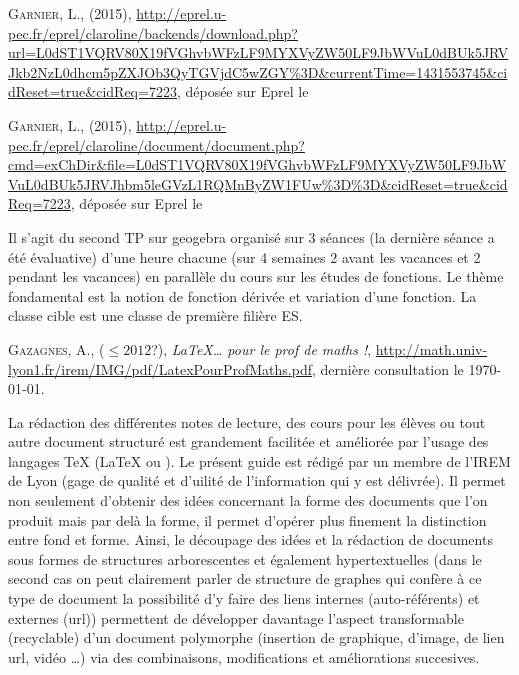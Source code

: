 \begin{thebibliography}{99}
  \textsc{Garnier}, L., (2015),
  \url{http://eprel.u-pec.fr/eprel/claroline/backends/download.php?url=L0dST1VQRV80X19fVGhvbWFzLF9MYXVyZW50LF9JbWVuL0dBUk5JRVJkb2NzL0dhcm5pZXJOb3QyTGVjdC5wZGY\%3D\&currentTime=1431553745\&cidReset=true\&cidReq=7223},
  déposée sur Eprel le \date{13 mai 2015}


  \textsc{Garnier}, L., (2015),
  \url{http://eprel.u-pec.fr/eprel/claroline/document/document.php?cmd=exChDir\&file=L0dST1VQRV80X19fVGhvbWFzLF9MYXVyZW50LF9JbWVuL0dBUk5JRVJhbm5leGVzL1RQMnByZW1FUw\%3D\%3D\&cidReset=true\&cidReq=7223},
  déposée sur Eprel le \date{13 mai 2015}

  Il s'agit du second TP sur geogebra organisé sur 3 séances (la dernière
  séance a été évaluative) d'une heure chacune (sur 4 semaines 2 avant
  les vacances et 2 pendant les vacances) en parallèle du cours sur
  les études de fonctions. Le thème fondamental est la notion de
  fonction dérivée et variation d'une fonction. La classe cible est une
  classe de première filière ES.


  \textsc{Gazagnes}, A., ($\leqslant 2012$?),
  \textit{\LaTeX{}\dots\xspace pour le prof de maths !},
  \url{http://math.univ-lyon1.fr/irem/IMG/pdf/LatexPourProfMaths.pdf},
  dernière consultation le \today{}.

  La rédaction des différentes notes de lecture, des cours pour les
  élèves ou tout autre document structuré est grandement facilitée et
  améliorée par l'usage des langages \TeX{} (\LaTeX{} ou \XeTeX{}). Le
  présent guide est rédigé par un membre de l'IREM de Lyon (gage de
  qualité et d'uilité de l'information qui y est délivrée). Il permet
  non seulement d'obtenir des idées concernant la forme des documents
  que l'on produit mais par delà la forme, il permet d'opérer plus
  finement la distinction entre fond et forme. Ainsi, le découpage des
  idées et la rédaction de documents sous formes de structures
  arborescentes et également hypertextuelles (dans le second cas on
  peut clairement parler de structure de graphes qui confère à ce type
  de document la possibilité d'y faire des liens internes
  (auto-référents) et externes (url)) permettent de développer
  davantage l'aspect transformable (recyclable) d'un document
  polymorphe (insertion de graphique, d'image, de lien url, vidéo
  \dots) via des combinaisons, modifications et améliorations succesives.


\end{thebibliography}
